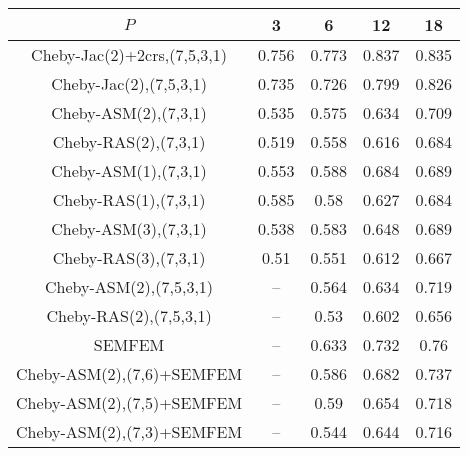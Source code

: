 \begin{table*}
\centering
\begin{tabular}{||c||cccc||}
	\hline
	$P$ & 3 & 6 & 12 & 18 \\
	\hline\hline
	Cheby-Jac(2)+2crs,(7,5,3,1)	&	0.756	&	0.773	&	0.837	&	0.835\\
	Cheby-Jac(2),(7,5,3,1)	&	0.735	&	0.726	&	0.799	&	0.826\\
	Cheby-ASM(2),(7,3,1)	&	0.535	&	0.575	&	0.634	&	0.709\\
	Cheby-RAS(2),(7,3,1)	&	0.519	&	0.558	&	0.616	&	0.684\\
	Cheby-ASM(1),(7,3,1)	&	0.553	&	0.588	&	0.684	&	0.689\\
	Cheby-RAS(1),(7,3,1)	&	0.585	&	0.58	&	0.627	&	0.684\\
	Cheby-ASM(3),(7,3,1)	&	0.538	&	0.583	&	0.648	&	0.689\\
	Cheby-RAS(3),(7,3,1)	&	0.51	&	0.551	&	0.612	&	0.667\\
	Cheby-ASM(2),(7,5,3,1)	&	 --	&	0.564	&	0.634	&	0.719\\
	Cheby-RAS(2),(7,5,3,1)	&	 --	&	0.53	&	0.602	&	0.656\\
	SEMFEM	&	 --	&	0.633	&	0.732	&	0.76\\
	Cheby-ASM(2),(7,6)+SEMFEM	&	 --	&	0.586	&	0.682	&	0.737\\
	Cheby-ASM(2),(7,5)+SEMFEM	&	 --	&	0.59	&	0.654	&	0.718\\
	Cheby-ASM(2),(7,3)+SEMFEM	&	 --	&	0.544	&	0.644	&	0.716\\
\hline
\end{tabular}
\caption{\label{table:foobar}}
\end{table*}
